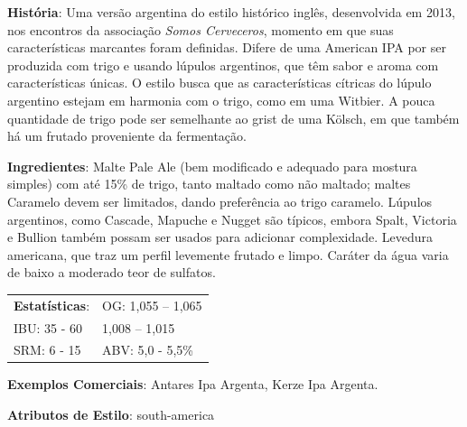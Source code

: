 \textbf{História}: Uma versão argentina do estilo histórico inglês, desenvolvida em 2013, nos encontros da associação \textit{Somos Cerveceros}, momento em que suas características marcantes foram definidas. Difere de uma American IPA por ser produzida com trigo e usando lúpulos argentinos, que têm sabor e aroma com características únicas. O estilo busca que as características cítricas do lúpulo argentino estejam em harmonia com o trigo, como em uma Witbier. A pouca quantidade de trigo pode ser semelhante ao grist de uma Kölsch, em que também há um frutado proveniente da fermentação.

\textbf{Ingredientes}: Malte Pale Ale (bem modificado e adequado para mostura simples) com até 15\% de trigo, tanto maltado como não maltado; maltes Caramelo devem ser limitados, dando preferência ao trigo caramelo. Lúpulos argentinos, como Cascade, Mapuche e Nugget são típicos, embora Spalt, Victoria e Bullion também possam ser usados para adicionar complexidade. Levedura americana, que traz um perfil levemente frutado e limpo. Caráter da água varia de baixo a moderado teor de sulfatos.

\begin{tabular}{@{}p{35mm}p{35mm}@{}}
  \textbf{Estatísticas}: & OG: 1,055 – 1,065 \\
  IBU: 35 - 60 & 1,008 – 1,015 \\
  SRM: 6 - 15 & ABV: 5,0 - 5,5\%
\end{tabular}

\textbf{Exemplos Comerciais}: Antares Ipa Argenta, Kerze Ipa Argenta.

\textbf{Atributos de Estilo}: south-america